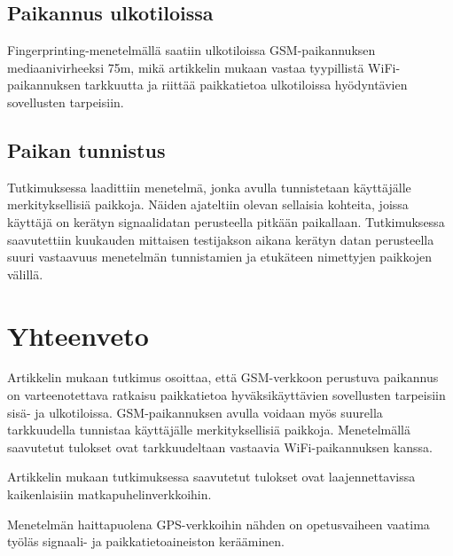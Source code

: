 \documentclass[a4paper]{scrartcl}
\begin{document}
\subsection{Paikannus ulkotiloissa}

Fingerprinting-menetelmällä saatiin ulkotiloissa GSM-paikannuksen mediaanivirheeksi 75m, mikä 
artikkelin mukaan vastaa tyypillistä WiFi-paikannuksen tarkkuutta ja riittää
paikkatietoa ulkotiloissa hyödyntävien sovellusten tarpeisiin.

\subsection{Paikan tunnistus}

Tutkimuksessa laadittiin menetelmä, jonka avulla tunnistetaan käyttäjälle
merkityksellisiä paikkoja. Näiden ajateltiin olevan sellaisia kohteita, joissa
käyttäjä on kerätyn signaalidatan perusteella pitkään paikallaan. Tutkimuksessa
saavutettiin kuukauden mittaisen testijakson aikana kerätyn datan perusteella suuri vastaavuus menetelmän tunnistamien ja etukäteen nimettyjen paikkojen välillä.

\section{Yhteenveto}

Artikkelin mukaan tutkimus osoittaa, että GSM-verkkoon perustuva paikannus
on varteenotettava ratkaisu paikkatietoa hyväksikäyttävien sovellusten tarpeisiin
sisä- ja ulkotiloissa. GSM-paikannuksen avulla voidaan myös suurella 
tarkkuudella tunnistaa käyttäjälle merkityksellisiä paikkoja. Menetelmällä saavutetut tulokset ovat tarkkuudeltaan vastaavia WiFi-paikannuksen kanssa.

Artikkelin mukaan tutkimuksessa saavutetut tulokset ovat laajennettavissa
kaikenlaisiin matkapuhelinverkkoihin.

Menetelmän haittapuolena GPS-verkkoihin nähden on opetusvaiheen vaatima työläs signaali- ja paikkatietoaineiston kerääminen.



\end{document}
